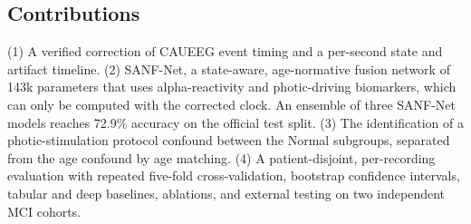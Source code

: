 \subsection{Contributions}
(1) A verified correction of CAUEEG event timing and a per-second state and artifact timeline.
(2) SANF-Net, a state-aware, age-normative fusion network of 143k parameters that uses alpha-reactivity and
photic-driving biomarkers, which can only be computed with the corrected clock. An ensemble of three SANF-Net
models reaches 72.9\% accuracy on the official test split.
(3) The identification of a photic-stimulation protocol confound between the Normal subgroups, separated from
the age confound by age matching.
(4) A patient-disjoint, per-recording evaluation with repeated five-fold cross-validation, bootstrap
confidence intervals, tabular and deep baselines, ablations, and external testing on two independent MCI
cohorts.
